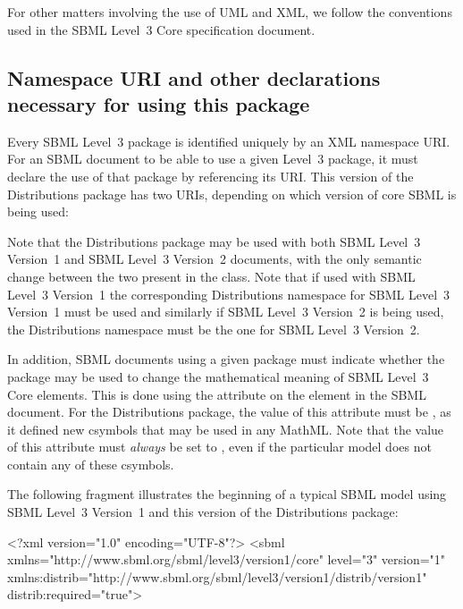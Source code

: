 \documentclass[draftspec]{sbmlpkgspec}
\newcommand{\sbmlthreecore}{SBML Level~3 Core\xspace}
\newcommand{\threeone}{SBML Level~3 Version~1\xspace}
\newcommand{\threetwo}{SBML Level~3 Version~2\xspace}
\newcommand{\DistribBase}{\defRef{DistribBase}{DistribBase-class}}
\newcommand{\distrib}{Distributions\xspace}
\begin{document}
For other matters involving the use of UML and XML, we follow the
conventions used in the SBML Level~3 Core specification document.  


\subsection{Namespace URI and other declarations necessary for using this package}
\label{xml-namespace}

Every SBML Level~3 package is identified uniquely by an XML namespace URI.  For an SBML document to be able to use a given Level~3 package, it must declare the use of that package by referencing its URI.  This version of the \distrib package has two URIs, depending on which version of core SBML is being used:
\begin{center}
\end{center}
\begin{center}
\end{center}


Note that the \distrib package may be used with both \threeone and \threetwo documents, with the only semantic change between the two present in the \DistribBase class. Note that if used with \threeone the corresponding \distrib namespace for \threeone must be used and similarly if \threetwo is being used, the \distrib namespace must be the one for \threetwo.


In addition, SBML documents using a given package must indicate whether the package may be used to change the mathematical meaning of \sbmlthreecore elements.  This is done using the attribute  on the  element in the SBML document.  For the \distrib package, the value of this attribute must be , as it defined new csymbols that may be used in any MathML.  Note that the value of this attribute must \emph{always} be set to , even if the particular model does not contain any of these csymbols.

The following fragment illustrates the beginning of a typical SBML model using \threeone and this version of the \distrib package:

\begin{example}
<?xml version="1.0" encoding="UTF-8"?>
<sbml xmlns="http://www.sbml.org/sbml/level3/version1/core" level="3" version="1"
      xmlns:distrib="http://www.sbml.org/sbml/level3/version1/distrib/version1"
      distrib:required="true">
\end{example}
\end{document}
